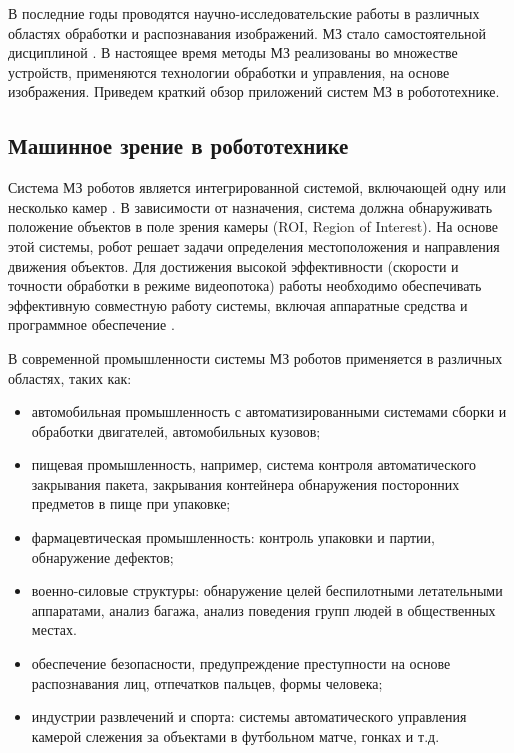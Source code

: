 В последние годы проводятся научно-исследовательские работы в различных областях обработки и распознавания изображений. МЗ стало самостоятельной дисциплиной \cite{Huang1991, Kevin1991}. В настоящее время методы МЗ реализованы во множестве устройств, применяются технологии обработки и управления, на основе изображения. Приведем краткий обзор приложений систем МЗ в робототехнике.


\subsection{Машинное зрение в робототехнике}

Система МЗ роботов является интегрированной системой, включающей одну или несколько камер \cite{Abebe2016}. В зависимости от назначения, система должна обнаруживать положение объектов в поле зрения камеры (ROI, Region of Interest). На основе этой системы, робот решает задачи определения местоположения и направления движения объектов. Для достижения высокой эффективности (скорости и точности обработки в режиме видеопотока) работы необходимо обеспечивать эффективную совместную работу системы, включая аппаратные средства и программное обеспечение \cite{Zhu2004, Vayda1991}.

В современной промышленности системы МЗ роботов применяется в различных областях, таких как:

\begin{itemize}
	\item автомобильная промышленность с автоматизированными системами сборки и обработки двигателей, автомобильных кузовов;
	\item пищевая промышленность, например, система контроля автоматического закрывания пакета, закрывания контейнера  обнаружения посторонних предметов в пище при упаковке;
	\item фармацевтическая промышленность: контроль упаковки и партии, обнаружение дефектов;
	\item военно-силовые структуры: обнаружение целей беспилотными летательными аппаратами, анализ багажа, анализ поведения групп людей в общественных местах.
	\item обеспечение безопасности, предупреждение преступности на основе распознавания лиц, отпечатков пальцев, формы человека;
	\item индустрии развлечений и спорта: системы автоматического управления камерой слежения за объектами в футбольном матче, гонках и т.д.
\end{itemize}

